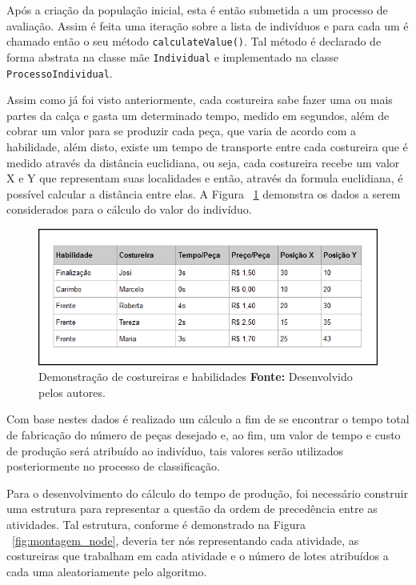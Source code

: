 \par Após a criação da população inicial, esta é então submetida a um processo
de avaliação. Assim é feita uma iteração sobre a lista de indivíduos e para cada um é chamado então o seu método 
\texttt{calculateValue()}. Tal método é declarado de forma abstrata na classe mãe
\texttt{Individual} e implementado na classe \texttt{ProcessoIndividual}.

\par Assim como já foi visto anteriormente, cada costureira sabe fazer uma ou
mais partes da calça e gasta um determinado tempo, medido em segundos, além de cobrar um valor 
para se produzir cada peça, que varia de  acordo com a habilidade, além disto, existe um 
tempo de transporte entre cada costureira que é medido através da distância euclidiana, 
ou seja, cada costureira recebe um valor X e Y que representam suas localidades e então, 
através da formula euclidiana, é possível calcular a distância entre elas. A Figura 
~\ref{fig:demonstracao_costureiras_habilidades} demonstra os dados a serem considerados para o
cálculo do valor do indivíduo.


\begin{figure}[h!]
	\centerline{\includegraphics[scale=0.5]{./imagens/tempo_habilidade_3.PNG}}
	\caption[Demonstração de costureiras e habilidades]
	{Demonstração de costureiras e habilidades \textbf{Fonte:} Desenvolvido pelos
	autores.}
	\label{fig:demonstracao_costureiras_habilidades}
\end{figure}

\par Com base nestes dados é realizado um cálculo a fim de se encontrar o tempo total de fabricação do número de peças
desejado e, ao fim, um valor de tempo e custo de produção será atribuído ao indivíduo, tais valores serão utilizados 
posteriormente no processo de classificação.

\par Para o desenvolvimento do cálculo do tempo de produção, foi necessário construir uma estrutura para representar a 
questão da ordem de precedência entre as atividades. Tal estrutura, conforme é demonstrado na Figura ~\ref{fig:montagem_node}, 
deveria ter nós representando cada atividade, as costureiras que trabalham em cada atividade e o número de lotes atribuídos a 
cada uma aleatoriamente pelo algoritmo.

